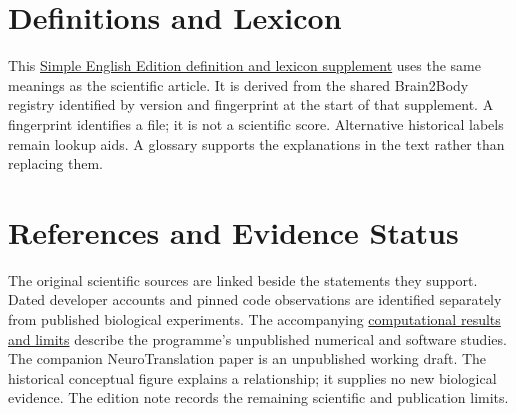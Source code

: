 \section{Definitions and Lexicon}

This \hyperref[programme-definitions]{Simple English Edition definition and lexicon supplement} uses the same meanings as the scientific article. It is derived from the shared Brain2Body registry identified by version and fingerprint at the start of that supplement. A fingerprint identifies a file; it is not a scientific score. Alternative historical labels remain lookup aids. A glossary supports the explanations in the text rather than replacing them.\par

\section{References and Evidence Status}

The original scientific sources are linked beside the statements they support.
Dated developer accounts and pinned code observations are identified separately
from published biological experiments. The accompanying
\href{research-evidence.json}{computational results and limits} describe the
programme's unpublished numerical and software studies. The companion
NeuroTranslation paper is an unpublished working draft. The historical
conceptual figure explains a relationship; it supplies no new biological
evidence. The edition note records the remaining scientific and publication
limits.\par

